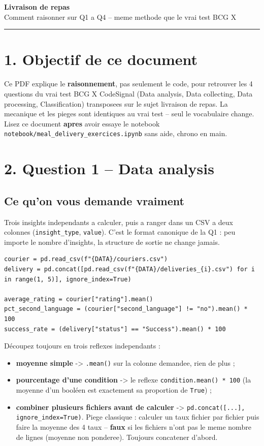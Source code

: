 \documentclass[11pt]{article}
\newcommand{\exhead}[1]{\subsection{#1}}
\begin{document}
\begin{center}
  {\huge\bfseries\color{bcg} Livraison de repas}\\[4pt]
  {\large Comment raisonner sur Q1 a Q4 -- meme methode que le vrai test BCG X}
\end{center}
\vspace{4pt}\hrule\vspace{10pt}

\section{1. Objectif de ce document}
Ce PDF explique le \textbf{raisonnement}, pas seulement le code, pour
retrouver les 4 questions du vrai test BCG X CodeSignal (Data analysis,
Data collecting, Data processing, Classification) transposees sur le sujet livraison de repas. La mecanique
et les pieges sont identiques au vrai test -- seul le vocabulaire change.
Lisez ce document \textbf{apres} avoir essaye le notebook
\texttt{notebook/meal\_delivery\_exercices.ipynb} sans
aide, chrono en main.

\section{2. Question 1 -- Data analysis}

\exhead{Ce qu'on vous demande vraiment}
Trois \og insights \fg{} independants a calculer, puis a ranger dans un
CSV a deux colonnes (\texttt{insight\_type}, \texttt{value}). C'est le
format canonique de la Q1 : peu importe le nombre d'insights, la structure
de sortie ne change jamais.

\begin{lstlisting}
courier = pd.read_csv(f"{DATA}/couriers.csv")
delivery = pd.concat([pd.read_csv(f"{DATA}/deliveries_{i}.csv") for i in range(1, 5)], ignore_index=True)

average_rating = courier["rating"].mean()
pct_second_language = (courier["second_language"] != "no").mean() * 100
success_rate = (delivery["status"] == "Success").mean() * 100
\end{lstlisting}

\begin{explik}
D\'ecoupez toujours en trois reflexes independants :
\begin{itemize}[nosep]
  \item \textbf{moyenne simple} -> \texttt{.mean()} sur la colonne
        demandee, rien de plus ;
  \item \textbf{pourcentage d'une condition} -> le reflexe
        \texttt{condition.mean() * 100} (la moyenne d'un bool\'een est
        exactement sa proportion de \texttt{True}) ;
  \item \textbf{combiner plusieurs fichiers avant de calculer} ->
        \texttt{pd.concat([...], ignore\_index=True)}. Piege classique :
        calculer un taux fichier par fichier puis faire la moyenne des 4
        taux -- \textbf{faux} si les fichiers n'ont pas le meme nombre de
        lignes (moyenne non ponderee). Toujours concatener d'abord.
\end{itemize}
\end{explik}
\end{document}
